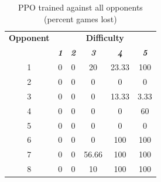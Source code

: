 \documentclass[conference]{IEEEtran}
\begin{document}
    \begin{table}[htbp]
        \caption{PPO trained against all opponents (percent games lost)}
        \begin{center}
            \begin{tabular}{|c|c|c|c|c|c|}
                \hline
                \textbf{Opponent}&\multicolumn{5}{|c|}{\textbf{Difficulty}} \\
                \cline{2-6}
                & \textbf{\textit{1}}& \textbf{\textit{2}}& \textbf{\textit{3}} & \textbf{\textit{4}} & \textbf{\textit{5}} \\
                \hline
                 1 &  0 &  0 &     20 &  23.33 &   100 \\
                 2 &  0 &  0 &      0 &      0 &     0 \\
                 3 &  0 &  0 &      0 &  13.33 &  3.33 \\
                 4 &  0 &  0 &      0 &      0 &    60 \\
                 5 &  0 &  0 &      0 &      0 &     0 \\
                 6 &  0 &  0 &      0 &    100 &   100 \\
                 7 &  0 &  0 &  56.66 &    100 &   100 \\
                 8 &  0 &  0 &     10 &    100 &   100 \\
                \hline
            \end{tabular}
            \label{PPO against all opponents games lost}
        \end{center}
    \end{table}
\end{document}
